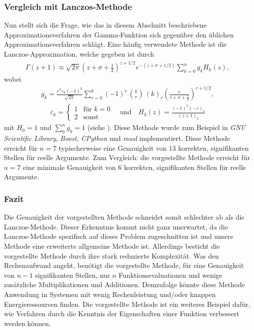 \subsubsection{Vergleich mit Lanczos-Methode}
Nun stellt sich die Frage,
wie das in diesem Abschnitt beschriebene Approximationsverfahren
der Gamma-Funktion sich gegenüber den üblichen Approximationsverfahren schlägt.
Eine häufig verwendete Methode ist die Lanczos-Approximation,
welche gegeben ist durch
\begin{align}
\Gamma(z + 1)
\approx
\sqrt{2\pi} \left( z + \sigma + \frac{1}{2} \right)^{z + 1/2}
e^{-(z + \sigma + 1/2)} \sum_{k=0}^n g_k H_k(z)
,
\end{align}
wobei
\begin{align*}
g_k = \frac{e^\sigma \varepsilon_k (-1)^k}{\sqrt{2\pi}}
\sum_{r=0}^k (-1)^r \, \binom{k}{r} \, (k)_r
\left( \frac{e}{r + \sigma + \frac{1}{2}}\right)^{r + 1/2}
,
\end{align*}
\begin{align*}
\varepsilon_k
=
\begin{cases}
1 & \text{für } k = 0 \\
2 & \text{sonst}
\end{cases}
\quad \text{und}\quad
H_k(z)
=
\frac{(-1)^k (-z)_k}{(z+1)_k}
\end{align*}
mit $H_0 = 1$ und $\sum_0^n g_k = 1$ (siehe \cite{laguerre:lanczos}).
Diese Methode wurde zum Beispiel in
{\em GNU Scientific Library}, {\em Boost}, {\em CPython} und
{\em musl} implementiert.
Diese Methode erreicht für $n = 7$ typischerweise eine Genauigkeit von $13$
korrekten, signifikanten Stellen für reelle Argumente.
Zum Vergleich: die vorgestellte Methode erreicht für $n = 7$
eine minimale Genauigkeit von $6$ korrekten, signifikanten Stellen
für reelle Argumente.

\subsubsection{Fazit}
Die Genauigkeit der vorgestellten Methode schneidet somit schlechter ab
als die Lanczos-Methode.
Dieser Erkenntnis kommt nicht ganz unerwartet,
da die Lanczos-Methode spezifisch auf dieses Problem zugeschnitten ist und
unsere Methode eine erweiterte allgemeine Methode ist.
Allerdings besticht die vorgestellte Methode
durch ihre stark reduzierte Komplexität. %
Was den Rechenaufwand angeht,
benötigt die vorgestellte Methode,
für eine Genauigkeit von $n-1$ signifikanten Stellen,
nur $n$ Funktionsevaluationen
und wenige zusätzliche Multiplikationen und Additionen.
Demzufolge könnte diese Methode Anwendung in Systemen mit wenig Rechenleistung
und/oder knappen Energieressourcen finden.
Die vorgestellte Methode ist ein weiteres Beispiel dafür,
wie Verfahren durch die Kenntnis der Eigenschaften einer Funktion
verbessert werden können.